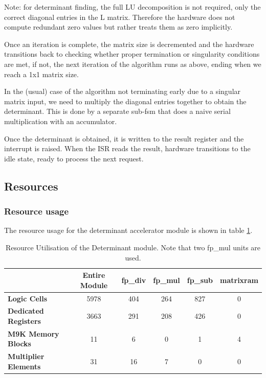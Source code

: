 \documentclass[]{article}
\begin{document}
Note: for determinant finding, the full LU decomposition is not required, only the correct diagonal entries in the L matrix. Therefore the hardware does not compute redundant zero values but rather treats them as zero implicitly.

Once an iteration is complete, the matrix size is decremented and the hardware transitions back to checking whether proper termination or singularity conditions are met, if not, the next iteration of the algorithm runs as above, ending when we reach a 1x1 matrix size.

In the (usual) case of the algorithm not terminating early due to a singular matrix input, we need to multiply the diagonal entries together to obtain the determinant. This is done by a separate sub-fsm that does a naive serial multiplication with an accumulator. 

Once the determinant is obtained, it is written to the result register and the interrupt is raised. When the ISR reads the result, hardware transitions to the idle state, ready to process the next request.

\subsection{Resources} %
\label{sub:resources}

\subsubsection{Resource usage} %
\label{sub:resource_usage}

The resource usage for the determinant accelerator module is shown in table \ref{tab:resource_util_det}.

\begin{table}[tbp]
	\caption{Resource Utilisation of the Determinant module. Note that two fp\_mul units are used.}
	\label{tab:resource_util_det}
	\begin{center}
		\begin{tabular}{l|ccccc}
		\hline

		\hline
											& \textbf{Entire Module} 	& \textbf{fp\_div} 		& \textbf{fp\_mul}	& \textbf{fp\_sub} 	& \textbf{matrixram} \\
		\hline
			\textbf{Logic Cells} 			& 5978						& 404 					& 264 				& 827 				& 0 \\
			\textbf{Dedicated Registers}	& 3663						& 291 					& 208 				& 426				& 0 \\
			\textbf{M9K Memory Blocks}		& 11						& 6 					& 0 				& 1 				& 4 \\
			\textbf{Multiplier Elements}	& 31						& 16 					& 7 				& 0					& 0 \\
		\hline

		\hline
		\end{tabular}
	\end{center}
\end{table}
\end{document}
